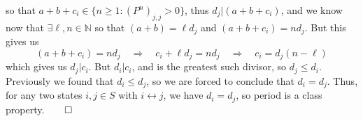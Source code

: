 \documentclass[11pt, letterpaper]{article}
\newcommand{\mbb}[1]{\mathbb{#1}}
\begin{document}
    so that $a+b+c_i\in\{n\geq 1:(P^n)_{j,j}>0\}$, thus $d_j|(a+b+c_i)$, and we know now that $\exists \ell,n\in\mbb{N}$ so that $(a+b)=\ell d_j$ and $(a+b+c_i)=nd_j$.  
    But this gives us
    \[(a+b+c_i)=nd_j\quad\Rightarrow\quad c_i+\ell d_j=nd_j\quad\Rightarrow\quad c_i=d_j(n-\ell)\]
    which gives us $d_j|c_i$. But $d_i|c_i$, and is the greatest such divisor, so $d_j\leq d_i$. Previously we found that $d_i\leq d_j$, so we are forced to conclude that $d_i=d_j$.
    Thus, for any two states $i,j\in S$ with $i\longleftrightarrow j$, we have $d_i=d_j$, so period is a class property.\hfill{$\qed$}
\end{document}
